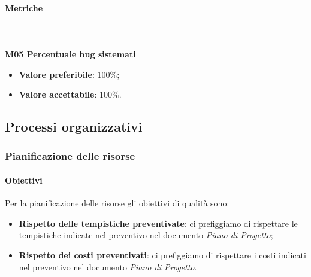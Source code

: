 			\paragraph{Metriche} \mbox{} \\ \\
			\textbf{M05 Percentuale bug sistemati}
			\begin{itemize}
				\item \textbf{Valore preferibile}: $100\%$;
				\item \textbf{Valore accettabile}: $100\%$. 
			\end{itemize}

	\subsection{Processi organizzativi}
		\subsubsection{Pianificazione delle risorse}
			\paragraph{Obiettivi}
			Per la pianificazione delle risorse gli obiettivi di qualità sono:
			\begin{itemize}
				\item \textbf{Rispetto delle tempistiche preventivate}: ci prefiggiamo di rispettare le tempistiche indicate nel preventivo nel documento \textit{Piano di Progetto};
				\item \textbf{Rispetto dei costi preventivati}: ci prefiggiamo di rispettare i costi indicati nel preventivo nel documento \textit{Piano di Progetto}.
			\end{itemize}	
